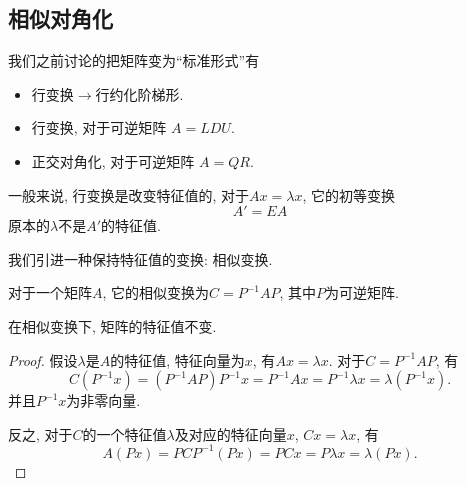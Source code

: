 
\subsection{相似对角化}
我们之前讨论的把矩阵变为``标准形式''有
\begin{itemize}
    \item 行变换$\longrightarrow$行约化阶梯形.
    \item 行变换, 对于可逆矩阵 $A = LDU$.
    \item 正交对角化, 对于可逆矩阵 $A = QR$.
\end{itemize}

一般来说, 行变换是改变特征值的, 对于$A x = \lambda x$, 它的初等变换
\begin{equation}
  A' = EA
\end{equation}
原本的$\lambda$不是$A'$的特征值.

我们引进一种保持特征值的变换: 相似变换.
\begin{definition}
    对于一个矩阵$A$, 它的相似变换为$C = P^{-1} A P$, 其中$P$为可逆矩阵.
\end{definition}

\begin{proposition}
    在相似变换下, 矩阵的特征值不变.
\end{proposition}
\begin{proof}
    假设$\lambda$是$A$的特征值, 特征向量为$x$, 有$A x = \lambda x$. 对于$C = P ^{-1}A P$, 有
    \begin{equation}
      C \left( P ^{-1} x \right) = \left( P ^{-1}AP \right) P ^{-1}x = P ^{-1} A x = P ^{-1} \lambda x = \lambda \left( P ^{-1} x \right). 
    \end{equation}
    并且$P ^{-1}x$为非零向量.

    反之, 对于$C$的一个特征值$\lambda$及对应的特征向量$x$, $Cx=\lambda x$, 有
    \begin{equation}
      A \left( Px \right) = P C P ^{-1} \left( Px \right)  = P C x = P \lambda x = \lambda \left( P x \right).
    \end{equation}
\end{proof}

